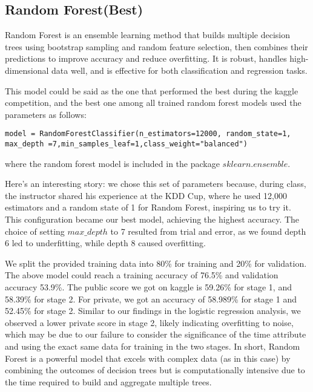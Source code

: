 \subsection*{Random Forest(Best)}
Random Forest is an ensemble learning method that builds multiple decision trees using bootstrap sampling and random feature selection, then combines their predictions to improve accuracy and reduce overfitting. It is robust, handles high-dimensional data well, and is effective for both classification and regression tasks.

This model could be said as the one that performed the best during the kaggle competition, and the best one among all trained random forest models used the parameters as follows:

\begin{verbatim}
model = RandomForestClassifier(n_estimators=12000, random_state=1,
max_depth =7,min_samples_leaf=1,class_weight="balanced")
\end{verbatim}
where the random forest model is included in the package $sklearn.ensemble$.

Here's an interesting story: we chose this set of parameters because, during class, the instructor shared his experience at the KDD Cup, where he used 12,000 estimators and a random state of 1 for Random Forest, inspiring us to try it. This configuration became our best model, achieving the highest accuracy. The choice of setting $max\_depth$ to 7 resulted from trial and error, as we found depth 6 led to underfitting, while depth 8 caused overfitting. 

We split the provided training data into 80\% for training and 20\% for validation. The above model could reach a training accuracy of 76.5\% and validation accuracy 53.9\%. The public score we got on kaggle is 59.26\% for stage 1, and 58.39\% for stage 2. For private, we got an accuracy of 58.989\% for stage 1 and 52.45\% for stage 2. Similar to our findings in the logistic regression analysis, we observed a lower private score in stage 2, likely indicating overfitting to noise, which may be due to our failure to consider the significance of the time attribute and using the exact same data for training in the two stages. In short, Random Forest is a powerful model that excels with complex data (as in this case) by combining the outcomes of decision trees but is computationally intensive due to the time required to build and aggregate multiple trees. 
